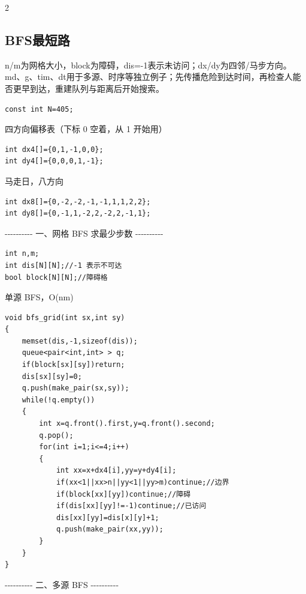 \documentclass[UTF8,fontset=fandol,a4paper,twoside]{ctexart}
\newcommand{\note}[1]{{\fontsize{10}{12}\selectfont #1\par}}
\begin{document}
\begin{multicols}{2}
\subsection{BFS最短路}

\note{n/\allowbreak{}m为网格大小，block为障碍，dis=\allowbreak{}-\allowbreak{}1表示未访问；dx/\allowbreak{}dy为四邻/\allowbreak{}马步方向。md、g、tim、dt用于多源、时序等独立例子；先传播危险到达时间，再检查人能否更早到达，重建队列与距离后开始搜索。}
\begin{lstlisting}
const int N=405;
\end{lstlisting}
\note{四方向偏移表（下标 0 空着，从 1 开始用）}
\begin{lstlisting}
int dx4[]={0,1,-1,0,0};
int dy4[]={0,0,0,1,-1};
\end{lstlisting}
\note{马走日，八方向}
\begin{lstlisting}
int dx8[]={0,-2,-2,-1,-1,1,1,2,2};
int dy8[]={0,-1,1,-2,2,-2,2,-1,1};
\end{lstlisting}
\note{-\allowbreak{}-\allowbreak{}-\allowbreak{}-\allowbreak{}-\allowbreak{}-\allowbreak{}-\allowbreak{}-\allowbreak{}-\allowbreak{}-\allowbreak{} 一、网格 BFS 求最少步数 -\allowbreak{}-\allowbreak{}-\allowbreak{}-\allowbreak{}-\allowbreak{}-\allowbreak{}-\allowbreak{}-\allowbreak{}-\allowbreak{}-\allowbreak{}}
\begin{lstlisting}
int n,m;
int dis[N][N];//-1 表示不可达
bool block[N][N];//障碍格
\end{lstlisting}
\note{单源 BFS，O(\allowbreak{}nm)\allowbreak{}}
\begin{lstlisting}
void bfs_grid(int sx,int sy)
{
    memset(dis,-1,sizeof(dis));
    queue<pair<int,int> > q;
    if(block[sx][sy])return;
    dis[sx][sy]=0;
    q.push(make_pair(sx,sy));
    while(!q.empty())
    {
        int x=q.front().first,y=q.front().second;
        q.pop();
        for(int i=1;i<=4;i++)
        {
            int xx=x+dx4[i],yy=y+dy4[i];
            if(xx<1||xx>n||yy<1||yy>m)continue;//边界
            if(block[xx][yy])continue;//障碍
            if(dis[xx][yy]!=-1)continue;//已访问
            dis[xx][yy]=dis[x][y]+1;
            q.push(make_pair(xx,yy));
        }
    }
}
\end{lstlisting}
\note{-\allowbreak{}-\allowbreak{}-\allowbreak{}-\allowbreak{}-\allowbreak{}-\allowbreak{}-\allowbreak{}-\allowbreak{}-\allowbreak{}-\allowbreak{} 二、多源 BFS -\allowbreak{}-\allowbreak{}-\allowbreak{}-\allowbreak{}-\allowbreak{}-\allowbreak{}-\allowbreak{}-\allowbreak{}-\allowbreak{}-\allowbreak{}}
\begin{lstlisting}

\end{lstlisting}
\end{multicols}
\end{document}
